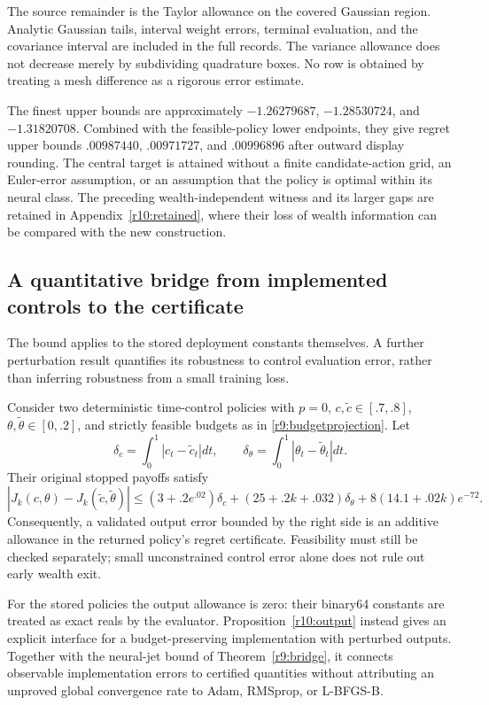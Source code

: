 \begin{table}[t]\centering\scriptsize
\caption{Separate upper-bound allowances at $k=2$}\label{r10:tab:allowances}

\par\smallskip\footnotesize The source remainder is the Taylor allowance on the covered Gaussian region. Analytic Gaussian tails, interval weight errors, terminal evaluation, and the covariance interval are included in the full records. The variance allowance does not decrease merely by subdividing quadrature boxes. No row is obtained by treating a mesh difference as a rigorous error estimate.
\end{table}

The finest upper bounds are approximately $-1.26279687$, $-1.28530724$, and $-1.31820708$. Combined with the feasible-policy lower endpoints, they give regret upper bounds $.00987440$, $.00971727$, and $.00996896$ after outward display rounding. The central target is attained without a finite candidate-action grid, an Euler-error assumption, or an assumption that the policy is optimal within its neural class. The preceding wealth-independent witness and its larger gaps are retained in Appendix~\ref{r10:retained}, where their loss of wealth information can be compared with the new construction.

\subsection{A quantitative bridge from implemented controls to the certificate}
The bound applies to the stored deployment constants themselves. A further perturbation result quantifies its robustness to control evaluation error, rather than inferring robustness from a small training loss.
\begin{proposition}\label{r10:output}
Consider two deterministic time-control policies with $p=0$, $c,\widetilde c\in[.7,.8]$, $\theta,\widetilde\theta\in[0,.2]$, and strictly feasible budgets as in \eqref{r9:budgetprojection}. Let
\[
 \delta_c=\int_0^1|c_t-\widetilde c_t|dt,\qquad
 \delta_\theta=\int_0^1|\theta_t-\widetilde\theta_t|dt.
\]
Their original stopped payoffs satisfy
\begin{equation}
 |J_k(c,\theta)-J_k(\widetilde c,\widetilde\theta)|
 \leq(3+.2e^{.02})\delta_c+(25+.2k+.032)\delta_\theta
           +8(14.1+.02k)e^{-72}.\label{r10:outputbound}
\end{equation}
Consequently, a validated output error bounded by the right side is an additive allowance in the returned policy's regret certificate. Feasibility must still be checked separately; small unconstrained control error alone does not rule out early wealth exit.
\end{proposition}
For the stored policies the output allowance is zero: their binary64 constants are treated as exact reals by the evaluator. Proposition~\ref{r10:output} instead gives an explicit interface for a budget-preserving implementation with perturbed outputs. Together with the neural-jet bound of Theorem~\ref{r9:bridge}, it connects observable implementation errors to certified quantities without attributing an unproved global convergence rate to Adam, RMSprop, or L-BFGS-B.
